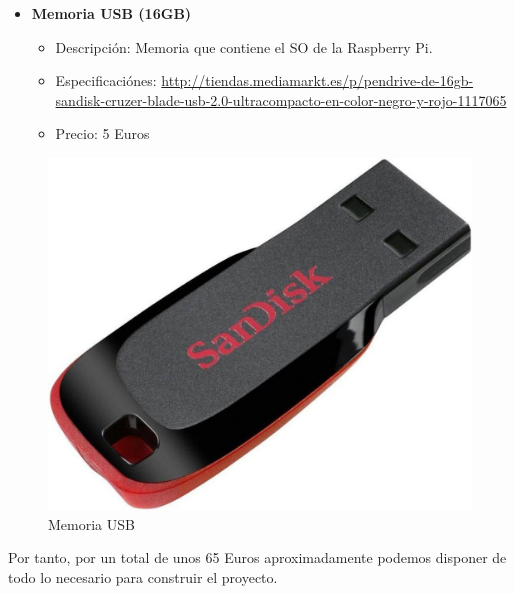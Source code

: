\begin{itemize}
 \item \textbf{Memoria USB (16GB)}
 \begin{itemize}
  \item Descripción: Memoria que contiene el SO de la Raspberry Pi.
  \item Especificaciónes: \url{http://tiendas.mediamarkt.es/p/pendrive-de-16gb-sandisk-cruzer-blade-usb-2.0-ultracompacto-en-color-negro-y-rojo-1117065}
  \item Precio: 5 Euros
 \end{itemize}
\end{itemize}
\begin{figure}[!ht]
  \begin{center}
    \includegraphics[scale=0.05]{../images/hardware/usbdrive.jpg}
    \caption{Memoria USB}
    \label{fig:soundcard}
  \end{center}
\end{figure}

Por tanto, por un total de unos 65 Euros aproximadamente podemos disponer de todo lo necesario para construir el proyecto.
